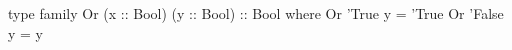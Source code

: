 \begin{code}
type family Or (x :: Bool) (y :: Bool) :: Bool where
  Or 'True  y = 'True
  Or 'False y = y
\end{code}
